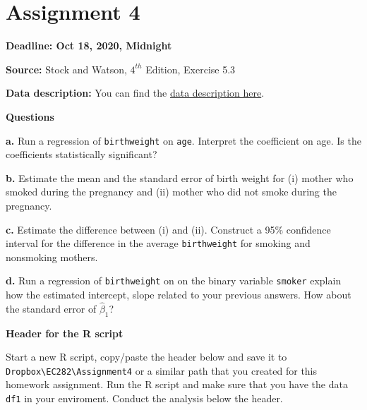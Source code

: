 \documentclass[
]{book}
\begin{document}
\hypertarget{assignment-4}{%
\section{Assignment 4}\label{assignment-4}}

\textbf{Deadline: Oct 18, 2020, Midnight}

\textbf{Source:} Stock and Watson, \(4^{th}\) Edition, Exercise 5.3

\textbf{Data description:} You can find the \href{https://www.dropbox.com/s/s0q564v6lplbexu/Birthweight_Smoking_Description.pdf?dl=1}{data description here}.

\textbf{Questions}

\textbf{a.} Run a regression of \texttt{birthweight} on \texttt{age}. Interpret the coefficient on age. Is the coefficients statistically significant?

\textbf{b.} Estimate the mean and the standard error of birth weight for (i) mother who smoked during the pregnancy and (ii) mother who did not smoke during the pregnancy.

\textbf{c.} Estimate the difference between (i) and (ii). Construct a 95\% confidence interval for the difference in the average \texttt{birthweight} for smoking and nonsmoking mothers.

\textbf{d.} Run a regression of \texttt{birthweight} on on the binary variable \texttt{smoker} explain how the estimated intercept, slope related to your previous answers. How about the standard error of \(\hat{\beta}_1\)?

\textbf{Header for the R script}

Start a new R script, copy/paste the header below and save it to \texttt{Dropbox\textbackslash{}EC282\textbackslash{}Assignment4} or a similar path that you created for this homework assignment. Run the R script and make sure that you have the data \texttt{df1} in your enviroment. Conduct the analysis below the header.
\end{document}

